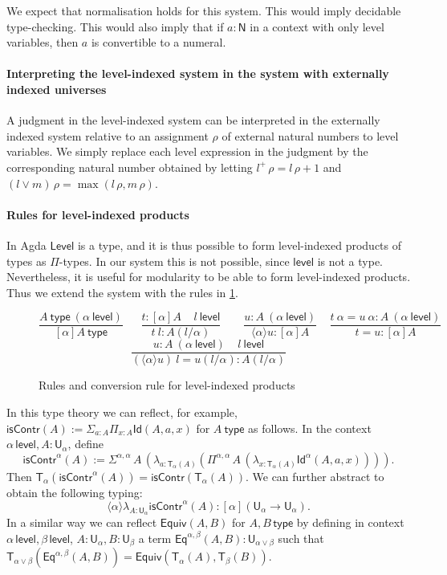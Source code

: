 \documentclass[a4paper,UKenglish,cleveref, autoref, thm-restate]{lipics-v2021}
\newcommand{\Id}{\mathsf{Id}}
\newcommand{\Eq}{\mathsf{Eq}}
\newcommand{\NN}{\mathsf{N}}
\newcommand{\UU}{\mathsf{U}}
\newcommand{\AgdaLevel}{\mathsf{Level}}
\newcommand{\Level}{\mathsf{level}}
\newcommand{\type}{\mathsf{type}}
\newcommand{\lam}[1]{{\langle}#1{\rangle}}
\newcommand{\mylam}[3]{\lambda_{#1:#2}#3}
\newcommand{\mypi}[3]{\Pi_{#1:#2}#3}
\newcommand{\Upi}[3]{\Pi^{#1}\,#2\,#3}
\newcommand{\mysig}[3]{\Sigma_{#1:#2}#3}
\newcommand{\Usig}[3]{\Sigma^{#1}\,#2\,#3}
\newcommand{\T}{\mathsf{T}}
\newcommand{\Equiv}{\mathsf{Equiv}}
\newcommand{\isContr}{\mathsf{isContr}}
\begin{document}
 We expect that normalisation holds for this system.
 This would imply decidable type-checking.
 This would also imply that if $a : \NN$ in a context with only
 level variables, then $a$ is convertible to a numeral.

\paragraph*{Interpreting the level-indexed system in the system with externally indexed universes}

A judgment in the level-indexed system can be interpreted in the externally indexed system relative to an assignment $\rho$ of external natural numbers to level variables. We simply replace each level expression in the judgment by the corresponding natural number obtained by letting $l^+\,\rho = l\,\rho+1$ and $(l \vee m)\,\rho = \max(l\,\rho,m\,\rho)$.

\paragraph*{Rules for level-indexed products}

In Agda $\AgdaLevel$ is a type,
and it is thus possible to form level-indexed products of types as $\Pi$-types.
In our system this is not possible, since $\Level$ is not a type. Nevertheless, it is useful for modularity to be able to form level-indexed products. Thus we extend the system with the rules in \cref{fig:levindprod}.
\begin{figure}[h!]
$$
\frac{A~\type~(\alpha~\Level)}{[\alpha]A~\type}~~~~~~~
\frac{t:[\alpha]A~~~~~l~\Level}
     {t~l:A(l/\alpha)}~~~~~~~~~
\frac{u:A~(\alpha~\Level)}{\lam{\alpha}{u}: [\alpha]A}~~~~~
\frac{t~\alpha = u~\alpha:A~(\alpha~\Level)}{t = u:[\alpha]A}
$$
$$
\frac{u:A~(\alpha~\Level)~~~~~l~\Level}
{(\lam{\alpha}{u})~l = u(l/\alpha): A(l/\alpha)}
$$
  \caption{Rules and conversion rule for level-indexed products}%
  \label{fig:levindprod}
\end{figure}

In this type theory we can reflect, for example, $\isContr(A) :=
\mysig{a}{A}{\mypi{x}{A}{\Id(A,a,x)}}$ for $A~\type$ as follows.
In the context $\alpha\,\Level, A: \UU_\alpha$, define
\[
\isContr^\alpha(A) :=
\Usig{\alpha,\alpha}{A}{(\mylam{a}{\T_\alpha(A)}
{(\Upi{\alpha,\alpha}{A}{(\mylam{x}{\T_\alpha(A)}{\Id^\alpha(A,a,x)})})})}.
\]
Then $\T_\alpha (\isContr^\alpha(A)) = \isContr(\T_\alpha(A))$.
We can further abstract to obtain the following typing:
\[
\lam{\alpha}{\mylam{A}{\UU_\alpha}{\isContr^\alpha(A)}} :
[\alpha](\UU_\alpha \to \UU_\alpha).
\]
In a similar way we can reflect $\Equiv(A,B)$ for $A,B\,\type$ by defining
in context $\alpha\,\Level,\beta\,\Level$, $A: \UU_\alpha, B: \UU_\beta$
a term $\Eq^{\alpha,\beta}(A,B) : \UU_{\alpha\vee\beta}$
such that $\T_{\alpha\vee\beta}(\Eq^{\alpha,\beta}(A,B))=
\Equiv(\T_{\alpha}(A),\T_{\beta}(B))$.
\end{document}
